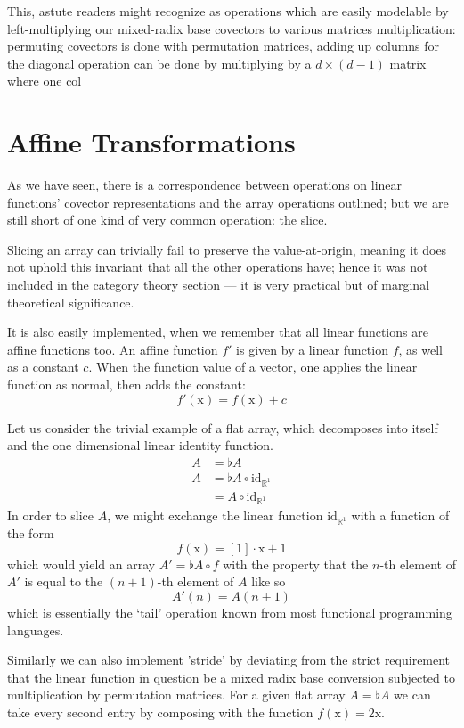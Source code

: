 \documentclass{DIKU-report-variant}
\newcommand\mrm[1]{\mathrm{#1}}
\newcommand\brm[1]{\bm{\mrm{#1}}}
\newcommand\Real{\mathbb{R}}
\begin{document}
This, astute readers might recognize as operations which are easily modelable by left-multiplying
our mixed-radix base covectors to various matrices
multiplication: permuting covectors is done with permutation matrices, adding up columns
for the diagonal operation can be done by multiplying by a \(d \times (d-1)\) matrix where
one col

\section{Affine Transformations}

As we have seen, there is a correspondence between operations on linear functions' covector representations
and the array operations outlined; but we are still short of one kind of very common operation: the slice.

Slicing an array can trivially fail to preserve the value-at-origin, meaning it does not uphold this invariant
that all the other operations have; hence it was not included in the category theory section --- it is very practical
but of marginal theoretical significance.

It is also easily implemented, when we remember that all linear functions are affine functions too. An affine function \(f'\)
is given by a linear function \(f\), as well as a constant \(c\). When the function value of a vector, one applies
the linear function as normal, then adds the constant:
\[ f'(\brm x) = f(\brm x) + c \]

Let us consider the trivial example of a flat array, which decomposes into itself and the one dimensional linear
identity function.
\begin{align*}
  A &= \flat A \\
  A &= \flat A \circ \mrm{id}_{\Real^1} \\&= A \circ \mrm{id}_{\Real^1}
\end{align*}
In order to slice \(A\), we might exchange the linear function \(\mrm{id}_{\Real^1}\) with a function of the form
\[ f(\brm x) = [1] \cdot \brm x + 1 \]
which would yield an array \(A' = \flat A \circ f\) with the property that the \(n\)-th element of \(A'\) is
equal to the \((n+1)\)-th element of \(A\) like so
\[ A'(n) = A(n+1) \]
which is essentially the `tail' operation known from most functional programming languages.

Similarly we can also implement 'stride' by deviating from the strict requirement that the linear function
in question be a mixed radix base conversion subjected to multiplication by permutation matrices. For a given
flat array \(A = \flat A\) we can take every second entry by composing with the function \(f(\brm x) = 2\brm x\).
\end{document}
